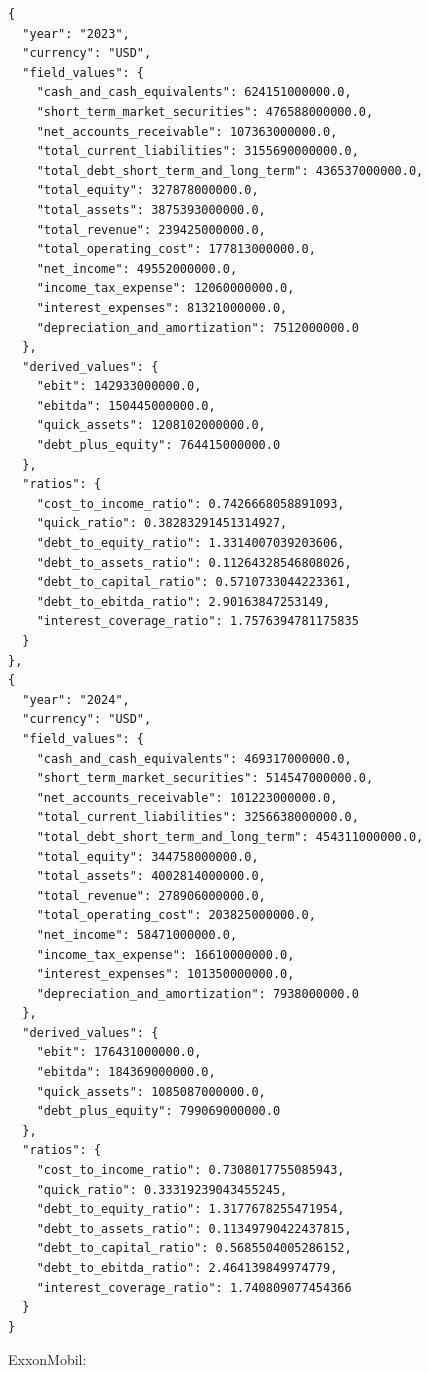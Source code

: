 \documentclass[12pt,a4paper]{article}
\begin{document}
\begin{lstlisting}[style=json, caption={Calculated financial ratios for JPMorgan Chase (FY\,2023--2024)}, label=lst:ratios_jpmorgan]
{
  "year": "2023",
  "currency": "USD",
  "field_values": {
    "cash_and_cash_equivalents": 624151000000.0,
    "short_term_market_securities": 476588000000.0,
    "net_accounts_receivable": 107363000000.0,
    "total_current_liabilities": 3155690000000.0,
    "total_debt_short_term_and_long_term": 436537000000.0,
    "total_equity": 327878000000.0,
    "total_assets": 3875393000000.0,
    "total_revenue": 239425000000.0,
    "total_operating_cost": 177813000000.0,
    "net_income": 49552000000.0,
    "income_tax_expense": 12060000000.0,
    "interest_expenses": 81321000000.0,
    "depreciation_and_amortization": 7512000000.0
  },
  "derived_values": {
    "ebit": 142933000000.0,
    "ebitda": 150445000000.0,
    "quick_assets": 1208102000000.0,
    "debt_plus_equity": 764415000000.0
  },
  "ratios": {
    "cost_to_income_ratio": 0.7426668058891093,
    "quick_ratio": 0.38283291451314927,
    "debt_to_equity_ratio": 1.3314007039203606,
    "debt_to_assets_ratio": 0.11264328546808026,
    "debt_to_capital_ratio": 0.5710733044223361,
    "debt_to_ebitda_ratio": 2.90163847253149,
    "interest_coverage_ratio": 1.7576394781175835
  }
},
{
  "year": "2024",
  "currency": "USD",
  "field_values": {
    "cash_and_cash_equivalents": 469317000000.0,
    "short_term_market_securities": 514547000000.0,
    "net_accounts_receivable": 101223000000.0,
    "total_current_liabilities": 3256638000000.0,
    "total_debt_short_term_and_long_term": 454311000000.0,
    "total_equity": 344758000000.0,
    "total_assets": 4002814000000.0,
    "total_revenue": 278906000000.0,
    "total_operating_cost": 203825000000.0,
    "net_income": 58471000000.0,
    "income_tax_expense": 16610000000.0,
    "interest_expenses": 101350000000.0,
    "depreciation_and_amortization": 7938000000.0
  },
  "derived_values": {
    "ebit": 176431000000.0,
    "ebitda": 184369000000.0,
    "quick_assets": 1085087000000.0,
    "debt_plus_equity": 799069000000.0
  },
  "ratios": {
    "cost_to_income_ratio": 0.7308017755085943,
    "quick_ratio": 0.33319239043455245,
    "debt_to_equity_ratio": 1.3177678255471954,
    "debt_to_assets_ratio": 0.11349790422437815,
    "debt_to_capital_ratio": 0.5685504005286152,
    "debt_to_ebitda_ratio": 2.464139849974779,
    "interest_coverage_ratio": 1.740809077454366
  }
}
\end{lstlisting}

ExxonMobil:
\end{document}
